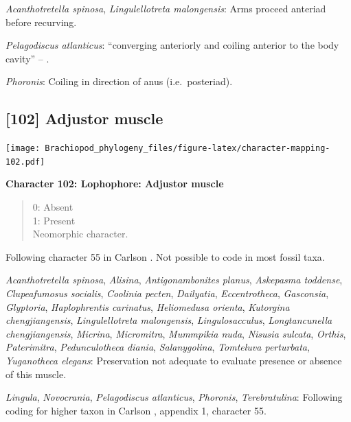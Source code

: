 \documentclass[openany]{book}
\theoremstyle{definition}
\theoremstyle{definition}
\theoremstyle{definition}
\theoremstyle{remark}
\begin{document}
\hypertarget{Acanthotretella_spinosa-coding-101}{}
\emph{Acanthotretella spinosa}, \emph{Lingulellotreta malongensis}: Arms
proceed anteriad before recurving.

\hypertarget{Pelagodiscus_atlanticus-coding-101}{}
\emph{Pelagodiscus atlanticus}: ``converging anteriorly and coiling
anterior to the body cavity'' -- \citet{Zhang2009Architectureand}.

\hypertarget{Phoronis-coding-101}{}
\emph{Phoronis}: Coiling in direction of anus (i.e.~posteriad).

\subsection*{{[}102{]} Adjustor muscle}\label{adjustor-muscle}

\texttt{[image: Brachiopod\_phylogeny\_files/figure-latex/character-mapping-102.pdf]}

\textbf{Character 102: Lophophore: Adjustor muscle}

\begin{quote}
0: Absent\\
1: Present\\
Neomorphic character.
\end{quote}

Following character 55 in Carlson
\citeyearpar{Carlson1995Phylogeneticrelationships}. Not possible to code
in most fossil taxa.

\hypertarget{Acanthotretella_spinosa-coding-102}{}
\emph{Acanthotretella spinosa}, \emph{Alisina}, \emph{Antigonambonites
planus}, \emph{Askepasma toddense}, \emph{Clupeafumosus socialis},
\emph{Coolinia pecten}, \emph{Dailyatia}, \emph{Eccentrotheca},
\emph{Gasconsia}, \emph{Glyptoria}, \emph{Haplophrentis carinatus},
\emph{Heliomedusa orienta}, \emph{Kutorgina chengjiangensis},
\emph{Lingulellotreta malongensis}, \emph{Lingulosacculus},
\emph{Longtancunella chengjiangensis}, \emph{Micrina},
\emph{Micromitra}, \emph{Mummpikia nuda}, \emph{Nisusia sulcata},
\emph{Orthis}, \emph{Paterimitra}, \emph{Pedunculotheca diania},
\emph{Salanygolina}, \emph{Tomteluva perturbata}, \emph{Yuganotheca
elegans}: Preservation not adequate to evaluate presence or absence of
this muscle.

\hypertarget{Lingula-coding-102}{}
\emph{Lingula}, \emph{Novocrania}, \emph{Pelagodiscus atlanticus},
\emph{Phoronis}, \emph{Terebratulina}: Following coding for higher taxon
in Carlson \citeyearpar{Carlson1995Phylogeneticrelationships}, appendix
1, character 55.
\end{document}
